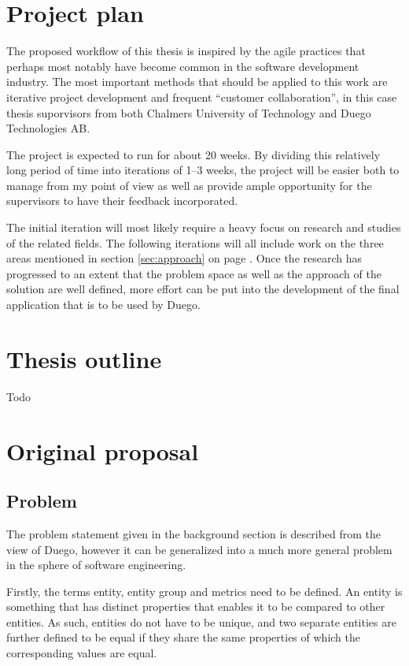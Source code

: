 \documentclass[a4paper]{article}
\begin{document}
\section{Project plan}
The proposed workflow of this thesis is inspired by the agile practices that perhaps most notably have become
common in the software development industry. The most important methods that should be applied to this work are
iterative project development and frequent ``customer collaboration'', in this case thesis suporvisors from both
Chalmers University of Technology and Duego Technologies AB.

The project is expected to run for about 20 weeks. By dividing this relatively long period of time into iterations
of 1--3 weeks, the project will be easier both to manage from my point of view as well as provide ample opportunity
for the supervisors to have their feedback incorporated.

The initial iteration will most likely require a heavy focus on research and studies of the related fields. The following
iterations will all include work on the three areas mentioned in section \ref{sec:approach} on page \pageref{sec:approach}.
Once the research has progressed to an extent that the problem space as well as the approach of the solution are well defined,
more effort can be put into the development of the final application that is to be used by Duego.

\section{Thesis outline}
Todo

\section{Original proposal}

\subsection{Problem}
The problem statement given in the background section is described from the view of Duego, however it can be generalized into
a much more general problem in the sphere of software engineering.

Firstly, the terms entity, entity group and metrics need to be defined. An entity is something that has distinct properties
that enables it to be compared to other entities. As such, entities do not have to be unique, and two separate entities are
further defined to be equal if they share the same properties of which the corresponding values are equal.
\end{document}
